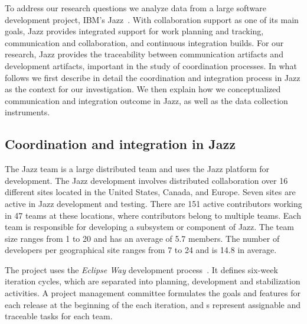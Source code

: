 To address our research questions we analyze data from a large software
development project, IBM's Jazz~\cite{frost:ieeesoftware:2007}. With collaboration support
as one of its main goals, Jazz provides integrated support for work planning and
tracking, communication and collaboration, and continuous integration builds. For
our research, Jazz provides the traceability between communication artifacts and
development artifacts, important in the study of coordination processes. In what
follows we first describe in detail the coordination and integration process in
Jazz as the context for our investigation. We then explain how we conceptualized
communication and integration outcome in Jazz, as well as the data collection
instruments.


\subsection{Coordination and integration in Jazz}
The Jazz team is a large distributed team and uses the Jazz platform for
development. The Jazz development involves distributed collaboration over 16
different sites located in the United States, Canada, and Europe. Seven sites are
active in Jazz development and testing. There are 151 active contributors
working in 47 teams at these locations, where contributors belong to multiple
teams. Each team is responsible for developing a subsystem or component of Jazz.
The team size ranges from 1 to 20 and has an average of 5.7 members. The number
of developers per geographical site ranges from 7 to 24 and is 14.8 in average.

The project uses the \emph{Eclipse Way} development process~\cite{frost:ieeesoftware:2007}.
It defines six-week iteration cycles, which are separated into planning,
development and stabilization activities. A project management committee
formulates the goals and features for each release at the beginning of the each
iteration, and s represent assignable and traceable tasks for each
team.

